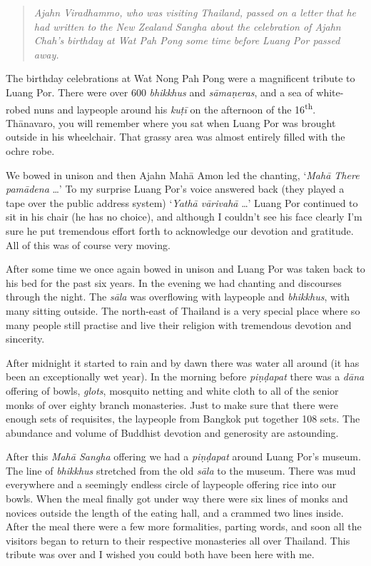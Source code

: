 
\begin{quote}\itshape
Ajahn Viradhammo, who was visiting Thailand, passed on a
letter that he had written to the New Zealand Sangha about the
celebration of Ajahn Chah's birthday at Wat Pah Pong some time before
Luang Por passed away.
\end{quote}

The birthday celebrations at Wat Nong Pah Pong were a magnificent
tribute to Luang Por. There were over 600 \emph{bhikkhus} and
\emph{sāmaṇeras}, and a sea of white-robed nuns and laypeople around his
\emph{kuṭī} on the afternoon of the 16\textsuperscript{th}. Thānavaro,
you will remember where you sat when Luang Por was brought outside in
his wheelchair. That grassy area was almost entirely filled with the
ochre robe.

We bowed in unison and then Ajahn Mahā Amon led the chanting, `\emph{Mahā There
pamādena} \ldots{}' To my surprise Luang Por's voice answered back (they played
a tape over the public address system) `\emph{Yathā vārivahā} \ldots{}' Luang
Por continued to sit in his chair (he has no choice), and although I couldn't
see his face clearly I'm sure he put tremendous effort forth to acknowledge our
devotion and gratitude. All of this was of course very moving.

After some time we once again bowed in unison and Luang Por was taken
back to his bed for the past six years. In the evening we had chanting
and discourses through the night. The \emph{sāla} was overflowing with
laypeople and \emph{bhikkhus}, with many sitting outside. The
north-east of Thailand is a very special place where so many people
still practise and live their religion with tremendous devotion and
sincerity.

After midnight it started to rain and by dawn there was water all around
 (it has been an exceptionally wet year). In the morning before
\emph{piṇḍapat} there was a \emph{dāna} offering of bowls, \emph{glots},
mosquito netting and white cloth to all of the senior monks of over
eighty branch monasteries. Just to make sure that there were enough sets
of requisites, the laypeople from Bangkok put together 108 sets. The
abundance and volume of Buddhist devotion and generosity are astounding.

After this \emph{Mahā Sangha} offering we had a \emph{piṇḍapat} around
Luang Por's museum. The line of \emph{bhikkhus} stretched from the old
\emph{sāla} to the museum. There was mud everywhere and a seemingly
endless circle of laypeople offering rice into our bowls. When the meal
finally got under way there were six lines of monks and novices outside
the length of the eating hall, and a crammed two lines inside. After the
meal there were a few more formalities, parting words, and soon all the
visitors began to return to their respective monasteries all over
Thailand. This tribute was over and I wished you could both have been
here with me. 

